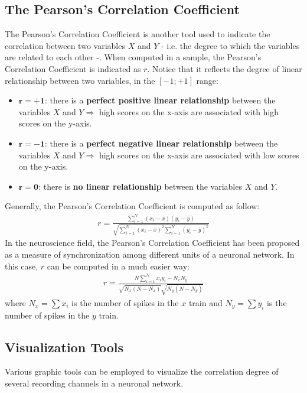 \subsection{The Pearson's Correlation Coefficient}
The Pearson's Correlation Coefficient is another tool used to indicate the correlation
between two variables \(X\) and \(Y\) - i.e. the degree to which the variables are related
to each other -. When computed in a sample, the Pearson's Correlation Coefficient is
indicated as \(r\). Notice that it reflects the degree of linear relationship between two
variables, in the \([-1;+1]\) range:
\begin{itemize}
    \item \(\mathbf{r=+1}\): there is a \textbf{perfect positive linear
              relationship} between the variables \(X\) and \(Y\Rightarrow\) high scores on
          the x-axis are associated with high scores on the y-axis.
    \item \(\mathbf{r=-1}\): there is a \textbf{perfect negative linear
              relationship} between the variables \(X\) and \(Y\Rightarrow\) high scores on
          the x-axis are associated with low scores on the y-axis.
    \item \(\mathbf{r=0}\): there is \textbf{no linear
              relationship} between the variables \(X\) and \(Y\).
\end{itemize}
Generally, the Pearson's Correlation Coefficient is computed as follow:
\begin{align*}
    r=\frac{\sum_{i=1}^{N}(x_i-\overline{x})(y_i-\overline{y})}{\sqrt{\sum_{i=1}^{N}(x_i-\overline{x})^2\sum_{i=1}^{N}(y_i-\overline{y})^2}}
\end{align*}
In the neuroscience field, the Pearson's Correlation Coefficient has been proposed
as a measure of synchronization among different units of a neuronal network.
In this case, \(r\) can be computed in a much easier way:
\begin{align*}
    r=\frac{N\sum_{i=1}^{N}x_{i}y_{i}-N_{x}N_{y}}{\sqrt{N_{x}(N-N_{x})}\sqrt{N_{y}(N-N_{y})}}
\end{align*}
where \(N_x=\sum{x_i}\) is the number of spikes in the \(x\) train and \(N_y=\sum{y_i}\) is the number of spikes in the \(y\) train.

\subsection{Visualization Tools}
Various graphic tools can be employed to visualize the correlation degree of several
recording channels in a neuronal network.

